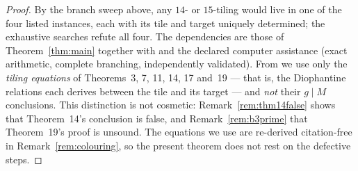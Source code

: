 \documentclass[11pt,reqno]{amsart}
\theoremstyle{plain}
\theoremstyle{definition}
\begin{document}
\begin{proof}
By the branch sweep above, any $14$- or $15$-tiling would live in one of the four listed instances,
each with its tile and target uniquely determined; the exhaustive searches refute all four. The
dependencies are those of Theorem~\ref{thm:main} together with \cite[Thm.~3]{BeesonEq} and the
declared computer assistance (exact arithmetic, complete branching, independently validated). From
\cite{BeesonIII} we use only the \emph{tiling equations} of Theorems~3, 7, 11, 14, 17 and~19 ---
that is, the Diophantine relations each derives between the tile and its target --- and \emph{not}
their $g\mid M$ conclusions. This distinction is not cosmetic: Remark~\ref{rem:thm14false} shows
that Theorem~14's conclusion is false, and Remark~\ref{rem:b3prime} that Theorem~19's proof is
unsound. The equations we use are re-derived citation-free in Remark~\ref{rem:colouring}, so the
present theorem does not rest on the defective steps.
\end{proof}
\end{document}
